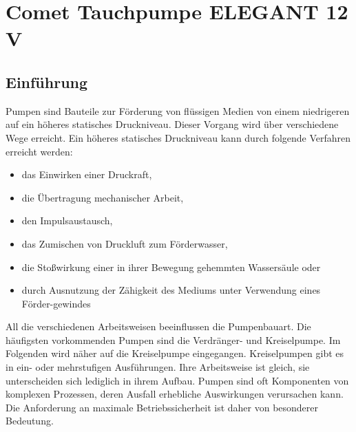 %
%
%


\chapter{Comet Tauchpumpe ELEGANT 12 V}\label{Pumpe}
\section{Einführung}
Pumpen sind Bauteile zur Förderung von flüssigen Medien von einem niedrigeren auf ein höheres statisches Druckniveau. Dieser Vorgang wird über verschiedene Wege erreicht. 
Ein höheres statisches Druckniveau kann durch folgende Verfahren erreicht werden: 
\begin{itemize}
	\item das Einwirken einer Druckraft, 
	\item die Übertragung mechanischer Arbeit, 
	\item den Impulsaustausch, 
	\item das Zumischen von Druckluft zum Förderwasser, 
	\item die Stoßwirkung einer in ihrer Bewegung gehemmten Wassersäule oder 
	\item durch Ausnutzung der Zähigkeit des Mediums unter Verwendung eines Förder-gewindes 
\end{itemize}
All die verschiedenen Arbeitsweisen beeinflussen die Pumpenbauart. Die häufigsten vorkommenden Pumpen sind die Verdränger- und Kreiselpumpe. 
Im Folgenden wird näher auf die Kreiselpumpe eingegangen. 
Kreiselpumpen gibt es in ein- oder mehrstufigen Ausführungen. Ihre Arbeitsweise ist gleich, sie unterscheiden sich lediglich in ihrem Aufbau.\cite{Schulz:2013}
Pumpen sind oft Komponenten von komplexen Prozessen, deren Ausfall erhebliche Auswirkungen verursachen kann. Die Anforderung an maximale Betriebssicherheit ist daher von besonderer Bedeutung.\cite{Gulich:2020}

